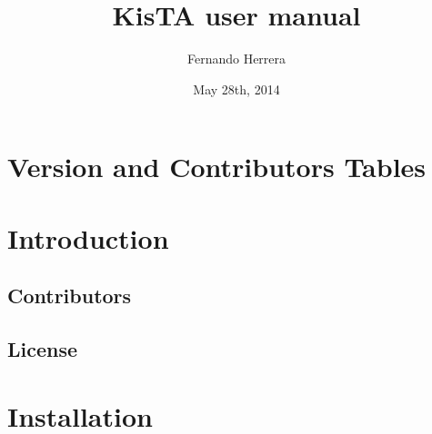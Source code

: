 \documentclass{article}
\title{KisTA user manual}
\author{Fernando Herrera}
\date{May 28th, 2014}
\newif\ifpdfformat
\begin{document}
\ifpdfformat



\pagebreak

\fi

\section{Version and Contributors Tables}



\ifpdfformat
\pagebreak
\fi





\tableofcontents

\newpage



\section{Introduction}
\label{sec:introduction}



\subsection{Contributors}
\label{sec:contributors}




\subsection{License}
\label{sec:license}



\section{Installation}
\label{sec:installation}
\end{document}
